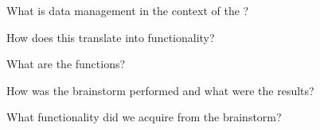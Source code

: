 What is data management in the context of the \ivfsystem{}?

How does this translate into functionality?

What are the functions?

How was the brainstorm performed and what were the results?

What functionality did we acquire from the brainstorm?